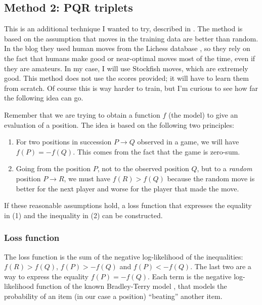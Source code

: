 \subsection{Method 2: PQR triplets}

This is an additional technique I wanted to try, described in \cite{dlchess:2014}. The method is based on the assumption that moves in the training data are better than random. In the blog they used human moves from the Lichess database \cite{lichessdb}, so they rely on the fact that humans make good or near-optimal moves most of the time, even if they are amateurs. In my case, I will use Stockfish moves, which are extremely good. This method does not use the scores provided; it will have to learn them from scratch. Of course this is way harder to train, but I'm curious to see how far the following idea can go.

Remember that we are trying to obtain a function $f$ (the model) to give an evaluation of a position. The idea is based on the following two principles:

\begin{enumerate}
\item For two positions in succession $P \rightarrow Q$ observed in a game, we will have \mbox{$f(P)=-f(Q)$}. This comes from the fact that the game is zero-sum.
\item Going from the position $P$, not to the observed position $Q$, but to a \textit{random} position $P \rightarrow R$, we must have $f(R) > f(Q)$ because the random move is better for the next player and worse for the player that made the move.
\end{enumerate}

If these reasonable assumptions hold, a loss function that expresses the equality in (1) and the inequality in (2) can be constructed.


\subsubsection{Loss function}

The loss function is the sum of the negative log-likelihood of the inequalities: ${f(R) > f(Q)}$, ${f(P) > - f(Q)}$ and ${f(P) < -f(Q)}$. The last two are a way to express the equality \mbox{$f(P)=-f(Q)$}. Each term is the negative log-likelihood function of the known Bradley-Terry model \cite{bradley-terry:1952}, that models the probability of an item (in our case a position) \enquote{beating} another item.

